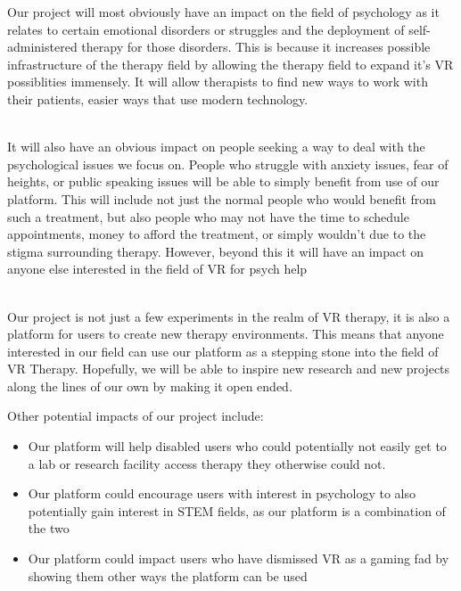 \documentclass[a4paper,10pt]{article}
\begin{document}
	
	Our project will most obviously have an impact on the field of psychology as it relates to certain emotional disorders or struggles and the deployment of self-administered 
	therapy for those disorders.  This is because it increases possible infrastructure of the therapy field by allowing the therapy field to expand it's VR possiblities immensely.  It will allow therapists to find new ways to work with their patients, easier ways that use modern technology.
	\par ~\\
	It will also have an obvious impact on people seeking a way to deal with the psychological issues we focus on.  People who struggle with anxiety issues, fear of heights, or public speaking issues will be able to simply benefit from use of our platform.  This will include not just the normal people who would benefit from such a treatment, but also people who may not have the time to schedule appointments, money to afford the treatment, or simply wouldn't due to the stigma surrounding therapy.  However, beyond this it will have an impact on anyone else interested in the field of VR for psych help
	\par ~\\
	Our project is not just a few experiments in the realm of VR therapy, it is also a platform for users to create new therapy environments.  This means that anyone interested in our field can use our platform as a stepping stone into the field of VR Therapy.  Hopefully, we will be able to inspire new research and new projects along the lines of our own by making it open ended.
	\par 
	
	Other potential impacts of our project include:
	\begin{itemize}
		\item Our platform will help disabled users who could potentially not easily get to a lab or research facility access therapy they otherwise could not.
		\item Our platform could encourage users with interest in psychology to also potentially gain interest in STEM fields, as our platform is a combination of the two
		\item Our platform could impact users who have dismissed VR as a gaming fad by showing them other ways the platform can be used
	\end{itemize}
	\pagebreak
\end{document}
